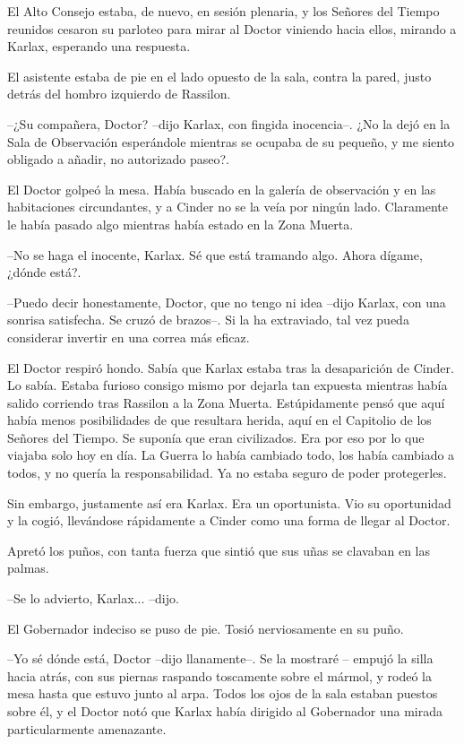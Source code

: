 El Alto Consejo estaba, de nuevo, en sesión plenaria, y los Señores del Tiempo reunidos cesaron su parloteo para mirar al Doctor viniendo hacia ellos, mirando a Karlax, esperando una respuesta.

El asistente estaba de pie en el lado opuesto de la sala, contra la pared, justo detrás del hombro izquierdo de Rassilon.

--¿Su compañera, Doctor? --dijo Karlax, con fingida inocencia--. ¿No la dejó en la Sala de Observación esperándole mientras se ocupaba de su pequeño, y me siento obligado a añadir, no autorizado paseo?.

El Doctor golpeó la mesa. Había buscado en la galería de observación y en las habitaciones circundantes, y a Cinder no se la veía por ningún lado. Claramente le había pasado algo mientras había estado en la Zona Muerta. 

--No se haga el inocente, Karlax. Sé que está tramando algo. Ahora dígame, ¿dónde está?.

--Puedo decir honestamente, Doctor, que no tengo ni idea --dijo Karlax, con una sonrisa satisfecha. Se cruzó de brazos--. Si la ha extraviado, tal vez pueda considerar invertir en una correa más eficaz.

El Doctor respiró hondo. Sabía que Karlax estaba tras la desaparición de Cinder. Lo sabía. Estaba furioso consigo mismo por dejarla tan expuesta mientras había salido corriendo tras Rassilon a la Zona Muerta. Estúpidamente pensó que aquí había menos posibilidades de que resultara herida, aquí en el Capitolio de los Señores del Tiempo. Se suponía que eran civilizados. Era por eso por lo que viajaba solo hoy en día. La Guerra lo había cambiado todo, los había cambiado a todos, y no quería la responsabilidad. Ya no estaba seguro de poder protegerles.

Sin embargo, justamente así era Karlax. Era un oportunista. Vio su oportunidad y la cogió, llevándose rápidamente a Cinder como una forma de llegar al Doctor.

Apretó los puños, con tanta fuerza que sintió que sus uñas se clavaban en las palmas. 

--Se lo advierto, Karlax... --dijo.

El Gobernador indeciso se puso de pie. Tosió nerviosamente en su puño. 

--Yo sé dónde está, Doctor --dijo llanamente--. Se la mostraré -- empujó la silla hacia atrás, con sus piernas raspando toscamente sobre el mármol, y rodeó la mesa hasta que estuvo junto al arpa. Todos los ojos de la sala estaban puestos sobre él, y el Doctor notó que Karlax había dirigido al Gobernador una mirada particularmente amenazante.

